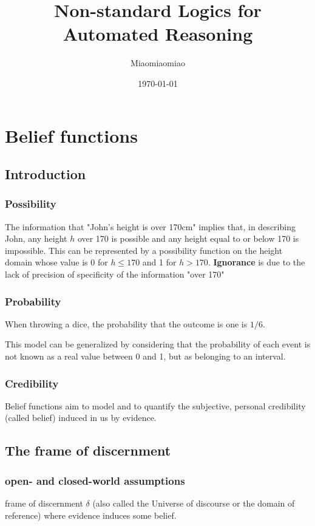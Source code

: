 \documentclass[11pt]{article}
\author{Miaomiaomiao}
\date{\today}
\title{Non-standard Logics for Automated Reasoning}
\begin{document}
\maketitle
\tableofcontents \clearpage
\section{Belief functions}
\label{sec:org22eb89a}
\subsection{Introduction}
\label{sec:org19a8f87}
\subsubsection{Possibility}
\label{sec:org6f22a50}
The information that "John's height is over 170cm" implies that, in
describing John, any height \(h\) over 170 is possible and any height equal to
or below 170 is impossible. This can be represented by a possibility
function on the height domain whose value is 0 for \(h\le 170\) and 1 for
\(h>170\). \textbf{Ignorance} is due to the lack of precision of specificity of the
information "over 170"
\subsubsection{Probability}
\label{sec:orgbd97aeb}
When throwing a dice, the probability that the outcome is one is \(1/6\).

This model can be generalized by considering that the probability of each
event is not known as a real value between 0 and 1, but as belonging to an
interval. 
\subsubsection{Credibility}
\label{sec:org2eee551}
Belief functions aim to model and to quantify the subjective, personal
credibility (called belief) induced in us by evidence. 
\subsection{The frame of discernment}
\label{sec:orgcd51fe5}
\subsubsection{open- and closed-world assumptions}
\label{sec:org6c2f6d9}
frame of discernment \(\delta\) (also called the Universe of discourse or the
domain of reference) where evidence induces some belief.
\end{document}
